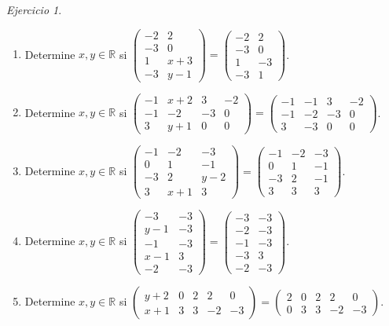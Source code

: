 \documentclass[12pt]{article}
\theoremstyle{remark}
\newtheorem{Ejer}[definicion]{Ejercicio}
\begin{document}
\begin{Ejer}
\begin{enumerate}[start=47]
\item Determine $x,y\in\mathbb R$ si $\begin{pmatrix}-2&2\\-3&0\\1&x + 3\\-3&y - 1\end{pmatrix}=\begin{pmatrix}-2&2\\-3&0\\1&-3\\-3&1\end{pmatrix}$.

\item Determine $x,y\in\mathbb R$ si $\begin{pmatrix}-1&x + 2&3&-2\\-1&-2&-3&0\\3&y + 1&0&0\end{pmatrix}=\begin{pmatrix}-1&-1&3&-2\\-1&-2&-3&0\\3&-3&0&0\end{pmatrix}$.

\item Determine $x,y\in\mathbb R$ si $\begin{pmatrix}-1&-2&-3\\0&1&-1\\-3&2&y - 2\\3&x + 1&3\end{pmatrix}=\begin{pmatrix}-1&-2&-3\\0&1&-1\\-3&2&-1\\3&3&3\end{pmatrix}$.

\item Determine $x,y\in\mathbb R$ si $\begin{pmatrix}-3&-3\\y - 1&-3\\-1&-3\\x - 1&3\\-2&-3\end{pmatrix}=\begin{pmatrix}-3&-3\\-2&-3\\-1&-3\\-3&3\\-2&-3\end{pmatrix}$.

\item Determine $x,y\in\mathbb R$ si $\begin{pmatrix}y + 2&0&2&2&0\\x + 1&3&3&-2&-3\end{pmatrix}=\begin{pmatrix}2&0&2&2&0\\0&3&3&-2&-3\end{pmatrix}$.


\end{enumerate}
\end{Ejer}
\end{document}
